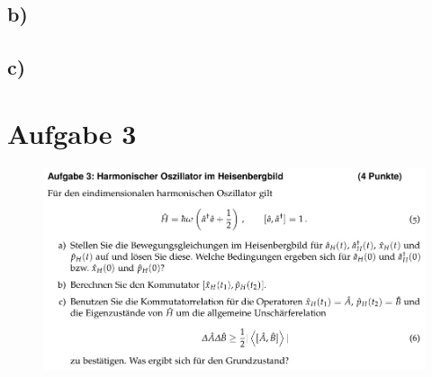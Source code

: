 \subsection{b)}

\subsection{c)}

\section{Aufgabe 3}

    \begin{figure}[H]
        \centering
        \includegraphics[width=\textwidth]{images/Aufgabe3.jpg}
        \label{fig:4}
    \end{figure}

